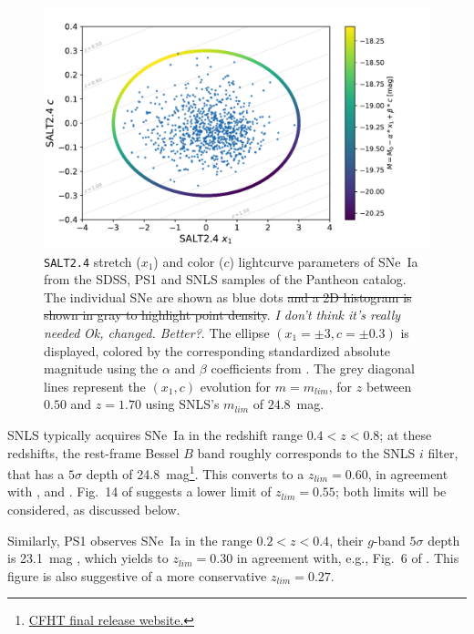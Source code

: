 \documentclass[]{aa} %
\newcommand{\nn}[1]{{\textcolor[rgb]{0.25, 0.50, 0}{#1}}}
\newcommand{\yc}[1]{{\textcolor{BrickRed}{#1}}}
\begin{document}
\begin{figure}
    \centering
    \includegraphics[width=0.95\linewidth]{Article_figures/zmax_maglim_snls.pdf}
    \caption{\textsc{\texttt{SALT2.4}} stretch ($x_1$) and color ($c$)
        lightcurve parameters of SNe~Ia from the SDSS, PS1 and SNLS samples of
        the Pantheon catalog. The individual SNe are shown as blue dots
        \nn{\sout{and a 2D histogram is shown in gray to highlight point
        density}}. \yc{\textit{I don't think it's really needed}} \nn{\textit{Ok,
changed. Better?}}. The ellipse $(x_1=\pm3, c=\pm0.3)$ is displayed, colored by
the corresponding standardized absolute magnitude using the $\alpha$ and $\beta$
coefficients from \cite{scolnic2018a}. The grey diagonal lines represent the
$(x_1, c)$ evolution for $m = m_{lim}$, for $z$ between $0.50$ and $z=1.70$
using SNLS's $m_{lim}$ of $24.8$~mag.}
    \label{fig:maglim}
\end{figure}

SNLS typically acquires SNe~Ia in the redshift range $0.4<z<0.8$; at these
redshifts, the rest-frame Bessel $B$ band roughly corresponds to the SNLS $i$
filter, that has a $5\sigma$ depth of
24.8~mag\footnote{\href{https://www.cfht.hawaii.edu/Science/CFHTLS/cfhtlsfinalreleaseexecsummary.html}{CFHT
final release website.}}. This converts to a $z_{lim}=0.60$, in agreement with
\cite{neill2006}, \cite{perrett2010} and \cite{bazin2011}.  Fig.~14 of
\cite{perrett2010} suggests a lower limit of $z_{lim}=0.55$; both limits will be
considered, as discussed below.

Similarly, PS1 observes SNe~Ia in the range $0.2<z<0.4$, their $g$-band
$5\sigma$ depth is 23.1~mag \citep{rest2014}, which yields to $z_{lim}=0.30$ in
agreement with, e.g., Fig.~6 of \cite{scolnic2018a}. This figure is also
suggestive of a more conservative $z_{lim}=0.27$.
\end{document}
